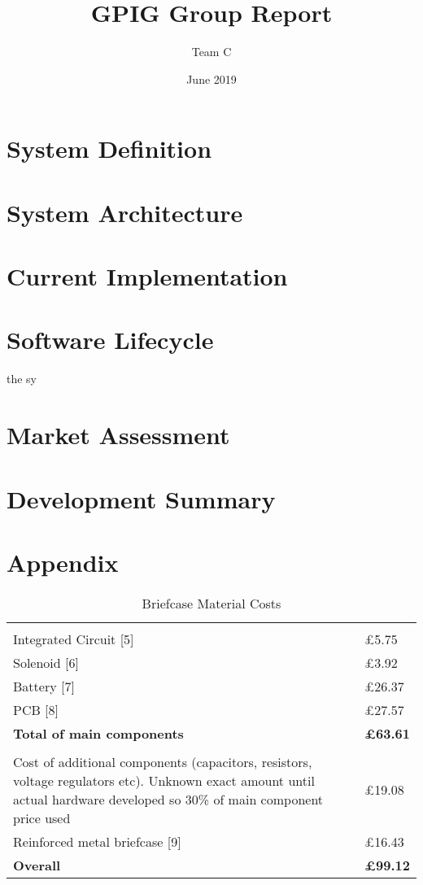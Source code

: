 \documentclass{UoYCSproject}
\title{GPIG Group Report}
\author{Team C}
\date{June 2019}
\begin{document}
\maketitle
{}
\chapter{System Definition} \label{systemdef}


\chapter{System Architecture} \label{systemarch}


\chapter{Current Implementation} \label{currentimp}


\chapter{Software Lifecycle} \label{softwarelife}
the sy

\chapter{Market Assessment} \label{market}


\chapter{Development Summary} \label{devsummary}


\appendix
\chapter{Appendix}

\begin{table}[!htbp]
\centering
    \begin{tabular}{p{}|p{}}
& \\
Integrated Circuit [5] & £5.75 \\
Solenoid [6] & £3.92 \\
Battery [7] & £26.37 \\
PCB [8] & £27.57 \\
\textbf{Total of main components} & \textbf{£63.61} \\
& \\
Cost of additional components 
(capacitors, resistors, voltage regulators etc). 
Unknown exact amount until actual hardware developed so 
30\% of main component price used & £19.08 \\
Reinforced metal briefcase [9] & £16.43 \\
\textbf{Overall} & \textbf{£99.12} \\
\end{tabular}
    \caption{Briefcase Material Costs}
    \label{tab:briefcasematcosts}
\end{table}

\printbibliography
\end{document}

